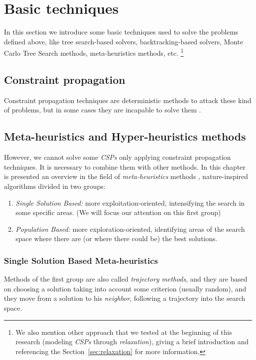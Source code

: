 \documentclass[a4paper]{book} %
\newcommand{\csp}{\textit{CSP}}
\newcommand{\csps}{\csp\textit{s}}
\begin{document}
\section{Basic techniques}

In this section we introduce some basic techniques used to solve the problems defined above, like tree search-based solvers, backtracking-based solvers, Monte Carlo Tree Search methods, meta-heuristics methods, etc. \footnote{We also mention other approach that we tested at the beginning of this research (modeling \csps{} through \textit{relaxation}), giving a brief introduction and referencing the Section~\ref{sec:relaxation} for more information.}

\subsection{Constraint propagation}

Constraint propagation techniques are deterministic methods to attack these kind of problems, but in some cases they are incapable to solve them \cite{ChristianBessiere2006}. 

\subsection{Meta-heuristics and Hyper-heuristics methods}

However, we cannot solve some \csps{} only applying constraint propagation techniques. It is necessary to combine them with other methods. In this chapter is presented an overview in the field of \textit{meta-heuristics} methods \cite{Boussaid2013}, nature-inspired algorithms divided in two groups: 
\begin{enumerate}
    \item {\it Single Solution Based:} more exploitation-oriented, intensifying the search in some specific areas. (We will focus our attention on this first group)
    \item {\it Population Based:} more exploration-oriented, identifying areas of the search space where there are (or where there could be) the best solutions.
\end{enumerate}

\subsubsection{Single Solution Based Meta-heuristics}

Methods of the first group are also called {\it trajectory methods}, and they are based on choosing a solution taking into account some criterion (usually random), and they move from a solution to his \textit{neighbor}, following a trajectory into the search space.
\end{document}
